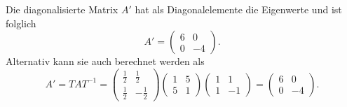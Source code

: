 \begin{loesung}
\begin{teilaufgaben}
\[\]
\item Die diagonalisierte Matrix $A'$ hat als Diagonalelemente die Eigenwerte und ist folglich
\[
    A' = \begin{pmatrix}
          6 & 0\\ 0 & -4
         \end{pmatrix}.
\]
Alternativ kann sie auch berechnet werden als
\[
    A' = TAT^{-1} =  
    \begin{pmatrix}\frac{1}{2} & \frac{1}{2}\\ \frac{1}{2} & -\frac{1}{2} \end{pmatrix}
    \begin{pmatrix} 1&5\\ 5&1 \end{pmatrix}
    \begin{pmatrix}1 & 1\\ 1 & -1 \end{pmatrix}
    = \begin{pmatrix}
          6 & 0\\ 0 & -4
         \end{pmatrix}.
\]
\qedhere
\end{teilaufgaben}
\end{loesung}

